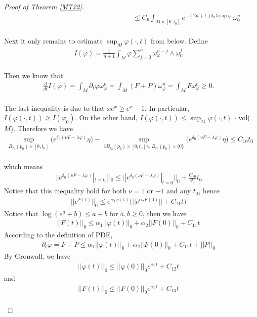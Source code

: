 \documentclass[11pt]{amsart}
\numberwithin{equation}{section}
\begin{document}
\begin{proof}[Proof of Theorem \ref{MT22}]
\begin{align}
		&\qquad\qquad\qquad\qquad\qquad\qquad\qquad\qquad \le  C_9  \int_{M\times [0,t_0]} e^{-(2n+1)\delta_0\lambda\sup\varphi}\,\omega_0^n
	\end{align}\\
	Next it only remains to estimate $\sup_M\varphi(\cdot,t)$ from below. Define 
	\begin{align}
		I(\varphi)=\frac{1}{n+1}\int_M\varphi\sum_{j=0}^n\omega_{\varphi}^{n-j}\wedge \omega_0^j
	\end{align}\\
	Then we know that:
	\begin{align}
		\frac{d}{dt}I(\varphi)=\int_M\partial_t\varphi\omega_{\varphi}^n=\int_M(F+P)\omega_{\varphi}^n=\int_MF\omega_{\varphi}^n\ge  0.
	\end{align}\\
	The last inequality is due to that $xe^x\ge  e^x-1$. In particular,  $I(\varphi(\cdot,t))\ge  I(\varphi_0)$.  On the other hand,  $I(\varphi(\cdot,t))\le  \sup_M\varphi(\cdot,t)\,\cdot\,$vol($M$). Therefore we have 
	\begin{align}
		\sup_{B_{r_0}(p_0)\times [0,t_0]}\big(e^{\delta_0(\nu F-\lambda\varphi)}\eta\big) - \sup_{\partial B_{r_0}(p_0)\times [0,t_0] \cup B_{r_0}(p_0)\times \{0\}}\big( e^{\delta_0(\nu F-\lambda\varphi)}\eta \big) \le  C_{10} t_0
	\end{align}\\
	which means
	\begin{align}
		||e^{\delta_0(\nu F-\lambda\varphi)}|_{t=t_0} ||_0\le  ||e^{\delta_0(\nu F-\lambda\varphi)}|_{t=0} ||_0 + \frac{C_{10}}{\theta_0} t_0
	\end{align}
	Notice that this inequality hold for both $\nu=1$ or $-1$ and any $t_0$, hence 
	\begin{align}
		||e^{F(t)}||_0 \le  e^{\alpha_1 \varphi(t)} \bigg(||e^{\alpha_2 F(0)}|| + C_{11}t\bigg)
	\end{align}
	Notice that $\log (e^a+b)\le  a+b$ for $a,b\ge  0$, then we have
	\begin{align}
		||F(t)||_0 \le  \alpha_1 ||\varphi(t)||_0 +\alpha_2 ||F(0)||_0 +C_{11}t
	\end{align}
	According to the definition of PDE, 
	\begin{align}
		\partial_t \varphi = F+P \le  \alpha_1 ||\varphi(t)||_0 +\alpha_2 ||F(0)||_0 +C_{11}t + ||P||_0
	\end{align}
	By Gronwall, we have 
	\begin{align}
		||\varphi(t)||_0 \le  ||\varphi(0)||_0 e^{\alpha_3 t} + C_{12}t
	\end{align}
	and 
	\begin{align}
		||F(t)||_0 \le   ||F(0)||_0 e^{\alpha_4 t} + C_{13}t
	\end{align} \\
\end{proof}
\end{document}
